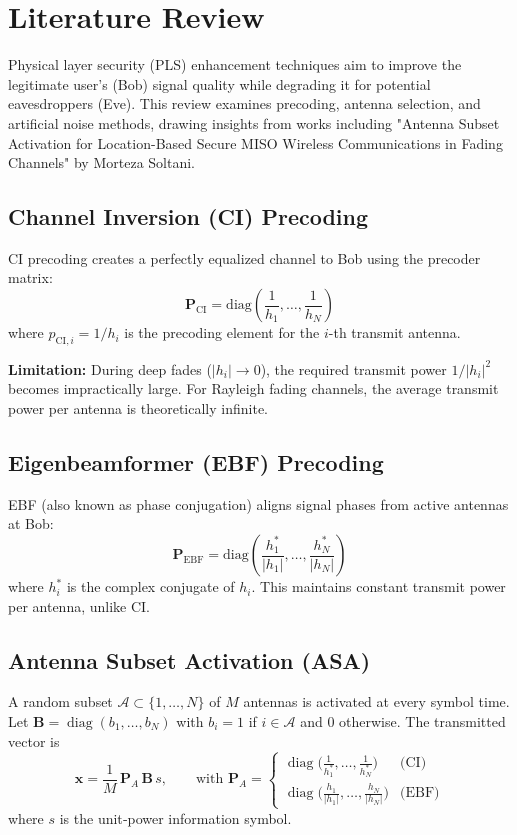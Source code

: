 \documentclass[10pt,a4paper]{article} %
\begin{document}
\section{Literature Review}

Physical layer security (PLS) enhancement techniques aim to improve the legitimate user's (Bob) signal quality while degrading it for potential eavesdroppers (Eve). This review examines precoding, antenna selection, and artificial noise methods, drawing insights from works including "Antenna Subset Activation for Location-Based Secure MISO Wireless Communications in Fading Channels" by Morteza Soltani.

\subsection{Channel Inversion (CI) Precoding}

CI precoding creates a perfectly equalized channel to Bob using the precoder matrix:
\begin{equation}
    \mathbf{P}_{\text{CI}} = \text{diag}\left(\frac{1}{h_1}, \dots, \frac{1}{h_N}\right)
\end{equation}
where $p_{\text{CI},i} = 1/h_i$ is the precoding element for the $i$-th transmit antenna.

\textbf{Limitation:} During deep fades ($|h_i| \to 0$), the required transmit power $1/|h_i|^2$ becomes impractically large. For Rayleigh fading channels, the average transmit power per antenna is theoretically infinite.

\subsection{Eigenbeamformer (EBF) Precoding}

EBF (also known as phase conjugation) aligns signal phases from active antennas at Bob:
\begin{equation}
    \mathbf{P}_{\text{EBF}} = \text{diag}\left(\frac{h_1^*}{|h_1|}, \dots, \frac{h_N^*}{|h_N|}\right)
\end{equation}
where $h_i^*$ is the complex conjugate of $h_i$. This maintains constant transmit power per antenna, unlike CI.

\subsection{Antenna Subset Activation (ASA)}\label{subsec:ASA}

A random subset $\mathcal{A}\subset\{1,\dots,N\}$ of $M$ antennas is activated at every symbol time.  
Let $\mathbf{B}\!=\!\operatorname{diag}(b_1,\dots,b_N)$ with $b_i\!=\!1$ if $i\!\in\!\mathcal{A}$ and $0$ otherwise.  
The transmitted vector is  
\[
\mathbf{x}= \frac{1}{M}\,\mathbf{P}_A\,\mathbf{B}\,s ,
\qquad\text{with } \mathbf{P}_A\!=
\begin{cases}
\operatorname{diag}\!\bigl(\tfrac{1}{h_1^*},\dots,\tfrac{1}{h_N^*}\bigr) & \text{(CI)}\\[4pt]
\operatorname{diag}\!\bigl(\tfrac{h_1}{|h_1|},\dots,\tfrac{h_N}{|h_N|}\bigr) & \text{(EBF)}
\end{cases}
\]
where $s$ is the unit‐power information symbol.
\end{document}

